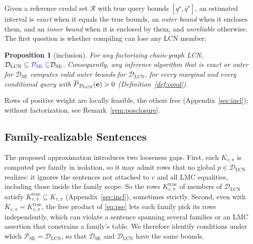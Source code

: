 \documentclass{article} %
\DeclareRobustCommand{\rev}[1]{{\color{blue}#1}}
\newtheorem{proposition}{Proposition}
\newcommand{\hi}{\overline}
\newcommand{\DSE}{\mathcal{D}_{\mathrm{SE}}}
\newcommand{\DLCN}{\mathcal{D}_{\mathrm{LCN}}}
\begin{document}
Given a reference credal set $\mathcal{R}$ with true query bounds $[\underline{q}^\star,\overline{q}^\star]$, an estimated interval is \emph{exact} when it equals the true bounds, an \emph{outer bound} when it encloses them, and an \emph{inner bound} when it is enclosed by them, and \emph{unreliable} otherwise. \rev{The first question is whether compiling can lose any LCN member:}

\begin{proposition}[inclusion]\label{prop:inclusion}
  For any \rev{factorizing} chain-graph LCN, $\DLCN \subseteq \rev{\mathcal P_{\mathrm{SE}}\subseteq}\DSE$. Consequently, any inference algorithm that is \emph{exact} or \emph{outer} for $\DSE$ computes valid \emph{outer bounds} for $\DLCN$\rev{, for every marginal and every conditional query with $\hi P_{\DLCN}(\be)>0$ (Definition~\ref{def:cond})}.
\end{proposition}
\rev{Rows of positive weight are locally feasible, the others free (Appendix~\ref{sec:incl}); without factorization, see Remark~\ref{rem:posclosure}.}

\subsection{Family-realizable Sentences}
\label{sec:realizable}

The proposed approximation introduces two looseness gaps. First, each $K_{v,\pi}$ is computed per family in isolation, so it may admit rows that no global $p\in \DLCN$ realizes: it ignores the sentences not attached to $v$ and all LMC equalities\rev{, including those inside the family scope}. So the rows $K^{\mathrm{true}}_{v,\pi}$ of members of $\DLCN$ satisfy $K^{\mathrm{true}}_{v,\pi}\subseteq K_{v,\pi}$ (Appendix~\ref{sec:incl}), sometimes strictly. \rev{Second, even with $K_{v,\pi} = K_{v,\pi}^{\mathrm{true}}$, the free product of \eqref{eq:pse} lets each family pick its rows independently, which can violate a sentence spanning several families or an LMC assertion that constrains a family's table. We therefore identify conditions under which $\mathcal P_{\mathrm{SE}} = \DLCN$, so that $\DSE$ and $\DLCN$ have the same bounds.}
\end{document}
